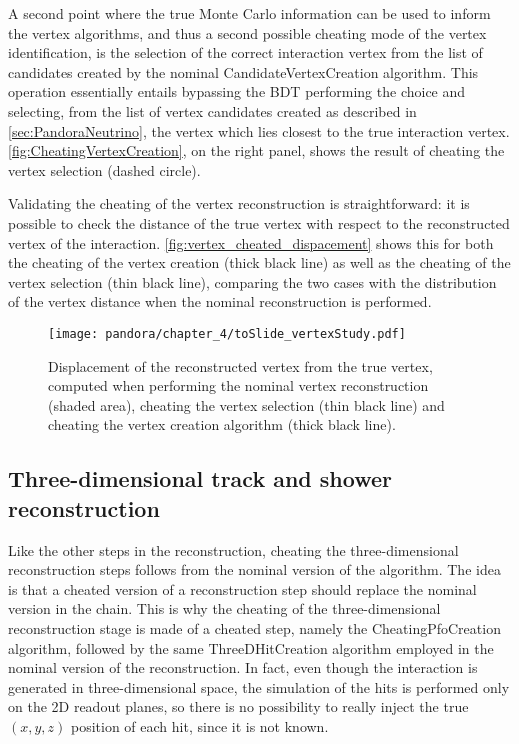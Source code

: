 A second point where the true Monte Carlo information can be used to inform the vertex algorithms, and thus a second possible cheating mode of the vertex identification, is the selection of the correct interaction vertex from the list of candidates created by the nominal CandidateVertexCreation algorithm. This operation essentially entails bypassing the BDT performing the choice and selecting, from the list of vertex candidates created as described in \autoref{sec:PandoraNeutrino}, the vertex which lies closest to the true interaction vertex. \autoref{fig:CheatingVertexCreation}, on the right panel, shows the result of cheating the vertex selection (dashed circle). 

Validating the cheating of the vertex reconstruction is straightforward: it is possible to check the distance of the true vertex with respect to the reconstructed vertex of the interaction. \autoref{fig:vertex_cheated_dispacement} shows this for both the cheating of the vertex creation (thick black line) as well as the cheating of the vertex selection (thin black line), comparing the two cases with the distribution of the vertex distance when the nominal reconstruction is performed. 

\begin{figure}
    \centering
    \texttt{[image: pandora/chapter\_4/toSlide\_vertexStudy.pdf]}
    \caption[Vertex displacement from truth]{Displacement of the reconstructed vertex from the true vertex, computed when performing the nominal vertex reconstruction (shaded area), cheating the vertex selection (thin black line) and cheating the vertex creation algorithm (thick black line). }
    \label{fig:vertex_cheated_dispacement}
\end{figure}


\subsection{Three-dimensional track and shower reconstruction}

Like the other steps in the reconstruction, cheating the three-dimensional reconstruction steps follows from the nominal version of the algorithm. The idea is that a cheated version of a reconstruction step should replace the nominal version in the chain. This is why the cheating of the three-dimensional reconstruction stage is made of a cheated step, namely the CheatingPfoCreation algorithm, followed by the same ThreeDHitCreation algorithm employed in the nominal version of the reconstruction. In fact, even though the interaction is generated in three-dimensional space, the simulation of the hits is performed only on the 2D readout planes, so there is no possibility to really inject the true $(x,y,z)$ position of each hit, since it is not known. 

